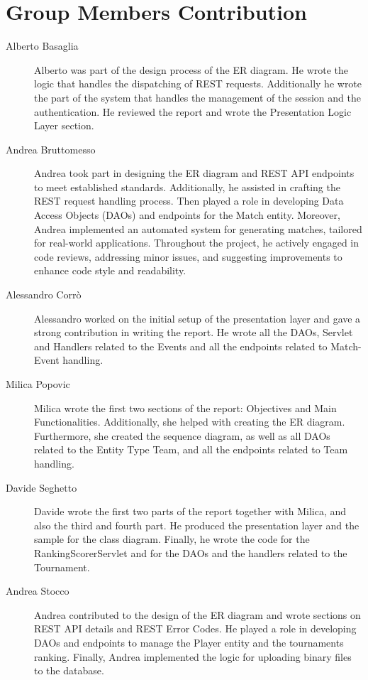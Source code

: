 \section{Group Members Contribution}

\begin{description}
	\item[Alberto Basaglia]
Alberto was part of the design process of the ER diagram.
He wrote the logic that handles the dispatching of REST requests.
Additionally he wrote the part of the system that handles the management of the session and the authentication.
He reviewed the report and wrote the Presentation Logic Layer section.
	\item[Andrea Bruttomesso]
Andrea took part in designing the ER diagram and REST API endpoints to meet established standards.
Additionally, he assisted in crafting the REST request handling process.
Then played a role in developing Data Access Objects (DAOs) and endpoints for the Match entity. Moreover, Andrea implemented an automated system for generating matches, tailored for real-world applications.
Throughout the project, he actively engaged in code reviews, addressing minor issues, and suggesting improvements to enhance code style and readability.
	\item[Alessandro Corrò]
Alessandro worked on the initial setup of the presentation layer and gave a strong contribution in writing the report.
He wrote all the DAOs, Servlet and Handlers related to the Events and all the endpoints related to Match-Event handling.
	\item[Milica Popovic]
Milica wrote the first two sections of the report: Objectives and Main Functionalities.
Additionally, she helped with creating the ER diagram.
Furthermore, she created the sequence diagram, as well as all DAOs related to the Entity Type Team, and all the endpoints related to Team handling.
	\item[Davide Seghetto]
Davide wrote the first two parts of the report together with Milica, and also the third and fourth part.
He produced the presentation layer and the sample for the class diagram. Finally, he wrote the code for the RankingScorerServlet and for the DAOs
and the handlers related to the Tournament.
	\item[Andrea Stocco]
 Andrea contributed to the design of the ER diagram and wrote sections on REST API details and REST Error Codes.
He played a role in developing DAOs and endpoints to manage the Player entity and the tournaments ranking.
Finally, Andrea implemented the logic for uploading binary files to the database.
\end{description}